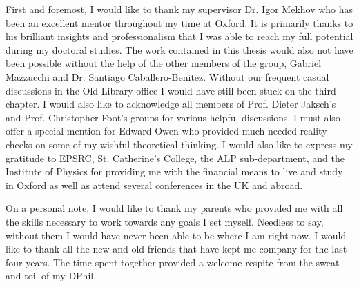 
\begin{acknowledgements}      

First and foremost, I would like to thank my supervisor Dr. Igor
Mekhov who has been an excellent mentor throughout my time at
Oxford. It is primarily thanks to his brilliant insights and
professionalism that I was able to reach my full potential during my
doctoral studies. The work contained in this thesis would also not
have been possible without the help of the other members of the group,
Gabriel Mazzucchi and Dr. Santiago Caballero-Benitez. Without our
frequent casual discussions in the Old Library office I would have
still been stuck on the third chapter. I would also like to
acknowledge all members of Prof. Dieter Jaksch's and Prof. Christopher
Foot's groups for various helpful discussions. I must also offer a
special mention for Edward Owen who provided much needed reality
checks on some of my wishful theoretical thinking. I would also like
to express my gratitude to EPSRC, St. Catherine's College, the ALP
sub-department, and the Institute of Physics for providing me with the
financial means to live and study in Oxford as well as attend several
conferences in the UK and abroad.

On a personal note, I would like to thank my parents who provided me
with all the skills necessary to work towards any goals I set
myself. Needless to say, without them I would have never been able to
be where I am right now. I would like to thank all the new and old
friends that have kept me company for the last four years. The time
spent together provided a welcome respite from the sweat and toil of
my DPhil.

\vspace{2em}

\end{acknowledgements}

